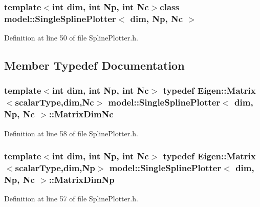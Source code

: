 \subsubsection*{template$<$int dim, int Np, int Nc$>$class model\+::\+Single\+Spline\+Plotter$<$ dim, Np, Nc $>$}



Definition at line 50 of file Spline\+Plotter.\+h.



\subsection{Member Typedef Documentation}
\hypertarget{classmodel_1_1_single_spline_plotter_a6dae49d6511813e2ff0f2c3bd1f5c200}{}
\subsubsection[{Matrix\+Dim\+Nc}]{\setlength{\rightskip}{0pt plus 5cm}template$<$int dim, int Np, int Nc$>$ typedef Eigen\+::\+Matrix$<${\bf scalar\+Type},{\bf dim},{\bf Nc}$>$ {\bf model\+::\+Single\+Spline\+Plotter}$<$ {\bf dim}, Np, {\bf Nc} $>$\+::{\bf Matrix\+Dim\+Nc}}\label{classmodel_1_1_single_spline_plotter_a6dae49d6511813e2ff0f2c3bd1f5c200}


Definition at line 58 of file Spline\+Plotter.\+h.

\hypertarget{classmodel_1_1_single_spline_plotter_a32dbbb243ef2981d79a67a22a19f4d17}{}
\subsubsection[{Matrix\+Dim\+Np}]{\setlength{\rightskip}{0pt plus 5cm}template$<$int dim, int Np, int Nc$>$ typedef Eigen\+::\+Matrix$<${\bf scalar\+Type},{\bf dim},Np$>$ {\bf model\+::\+Single\+Spline\+Plotter}$<$ {\bf dim}, Np, {\bf Nc} $>$\+::{\bf Matrix\+Dim\+Np}}\label{classmodel_1_1_single_spline_plotter_a32dbbb243ef2981d79a67a22a19f4d17}


Definition at line 57 of file Spline\+Plotter.\+h.

